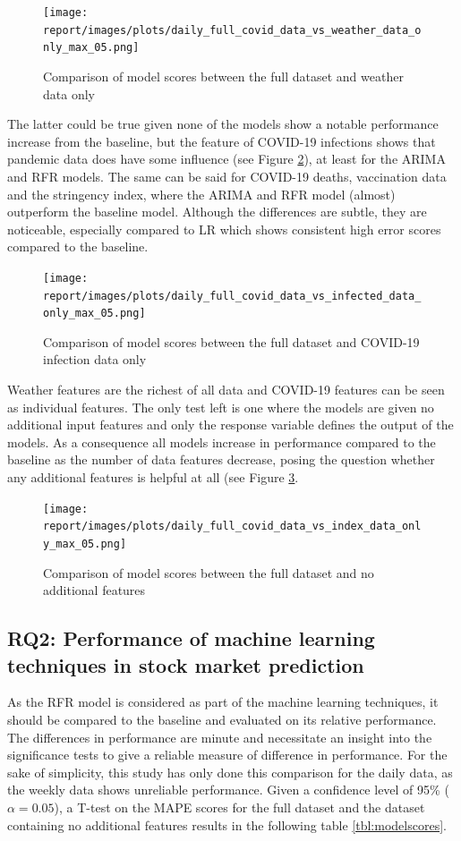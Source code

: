 \begin{figure}[H]
    \texttt{[image: report/images/plots/daily\_full\_covid\_data\_vs\_weather\_data\_only\_max\_05.png]}
    \caption{Comparison of model scores between the full dataset and weather data only}
    \label{fig:weathervfull}
\end{figure}

The latter could be true given none of the models show a notable performance increase from the baseline, but the feature of COVID-19 infections shows that pandemic data does have some influence (see Figure \ref{fig:infectvfull}), at least for the ARIMA and RFR models. The same can be said for COVID-19 deaths, vaccination data and the stringency index, where the ARIMA and RFR model (almost) outperform the baseline model. Although the differences are subtle, they are noticeable, especially compared to LR which shows consistent high error scores compared to the baseline.

\begin{figure}[H]
    \texttt{[image: report/images/plots/daily\_full\_covid\_data\_vs\_infected\_data\_only\_max\_05.png]}
    \caption{Comparison of model scores between the full dataset and COVID-19 infection data only}
    \label{fig:infectvfull}
\end{figure}

Weather features are the richest of all data and COVID-19 features can be seen as individual features. The only test left is one where the models are given no additional input features and only the response variable defines the output of the models. As a consequence all models increase in performance compared to the baseline as the number of data features decrease, posing the question whether any additional features is helpful at all (see Figure \ref{fig:indexvfull}. 

\begin{figure}[H]
    \texttt{[image: report/images/plots/daily\_full\_covid\_data\_vs\_index\_data\_only\_max\_05.png]}
    \caption{Comparison of model scores between the full dataset and no additional features}
    \label{fig:indexvfull}
\end{figure}

\subsection{RQ2: Performance of machine learning techniques in stock market prediction}
As the RFR model is considered as part of the machine learning techniques, it should be compared to the baseline and evaluated on its relative performance. The differences in performance are minute and necessitate an insight into the significance tests to give a reliable measure of difference in performance. For the sake of simplicity, this study has only done this comparison for the daily data, as the weekly data shows unreliable performance. Given a confidence level of 95\% ($\alpha = 0.05$), a T-test on the MAPE scores for the full dataset and the dataset containing no additional features results in the following table \ref{tbl:modelscores}.

